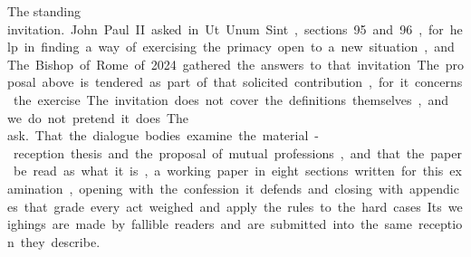 \unit{The standing invitation.}
John Paul II asked in Ut Unum Sint, sections 95 and 96, for help in finding a way of exercising the primacy open to a new situation, and The Bishop of Rome of 2024 gathered the answers to that invitation. The proposal above is tendered as part of that solicited contribution, for it concerns the exercise. The invitation does not cover the definitions themselves, and we do not pretend it does.

\unit{The ask.}
That the dialogue bodies examine the material-reception thesis and the proposal of mutual professions, and that the paper be read as what it is, a working paper in eight sections written for this examination, opening with the confession it defends and closing with appendices that grade every act weighed and apply the rules to the hard cases. Its weighings are made by fallible readers and are submitted into the same reception they describe.
